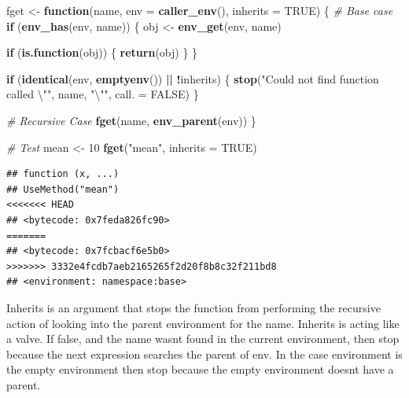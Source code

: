 \documentclass[]{book}
\newenvironment{Shaded}{\begin{snugshade}}{\end{snugshade}}
\newcommand{\CharTok}[1]{\textcolor[rgb]{0.31,0.60,0.02}{#1}}
\newcommand{\CommentTok}[1]{\textcolor[rgb]{0.56,0.35,0.01}{\textit{#1}}}
\newcommand{\ControlFlowTok}[1]{\textcolor[rgb]{0.13,0.29,0.53}{\textbf{#1}}}
\newcommand{\DataTypeTok}[1]{\textcolor[rgb]{0.13,0.29,0.53}{#1}}
\newcommand{\DecValTok}[1]{\textcolor[rgb]{0.00,0.00,0.81}{#1}}
\newcommand{\KeywordTok}[1]{\textcolor[rgb]{0.13,0.29,0.53}{\textbf{#1}}}
\newcommand{\NormalTok}[1]{#1}
\newcommand{\OperatorTok}[1]{\textcolor[rgb]{0.81,0.36,0.00}{\textbf{#1}}}
\newcommand{\OtherTok}[1]{\textcolor[rgb]{0.56,0.35,0.01}{#1}}
\newcommand{\StringTok}[1]{\textcolor[rgb]{0.31,0.60,0.02}{#1}}
\begin{document}
\begin{Shaded}
\begin{Highlighting}[]
\NormalTok{fget <-}\StringTok{ }\ControlFlowTok{function}\NormalTok{(name, }\DataTypeTok{env =} \KeywordTok{caller_env}\NormalTok{(), }\DataTypeTok{inherits =} \OtherTok{TRUE}\NormalTok{) \{}
  \CommentTok{# Base case}
  \ControlFlowTok{if}\NormalTok{ (}\KeywordTok{env_has}\NormalTok{(env, name)) \{}
\NormalTok{    obj <-}\StringTok{ }\KeywordTok{env_get}\NormalTok{(env, name)}

    \ControlFlowTok{if}\NormalTok{ (}\KeywordTok{is.function}\NormalTok{(obj)) \{}
      \KeywordTok{return}\NormalTok{(obj)}
\NormalTok{    \}}
\NormalTok{  \}}

  \ControlFlowTok{if}\NormalTok{ (}\KeywordTok{identical}\NormalTok{(env, }\KeywordTok{emptyenv}\NormalTok{()) }\OperatorTok{||}\StringTok{ }\OperatorTok{!}\NormalTok{inherits) \{}
    \KeywordTok{stop}\NormalTok{(}\StringTok{"Could not find function called }\CharTok{\textbackslash{}"}\StringTok{"}\NormalTok{, name, }\StringTok{"}\CharTok{\textbackslash{}"}\StringTok{"}\NormalTok{, }\DataTypeTok{call. =} \OtherTok{FALSE}\NormalTok{)}
\NormalTok{  \}}

  \CommentTok{# Recursive Case}
  \KeywordTok{fget}\NormalTok{(name, }\KeywordTok{env_parent}\NormalTok{(env))}
\NormalTok{\}}
\end{Highlighting}
\end{Shaded}

\begin{Shaded}
\begin{Highlighting}[]
\CommentTok{# Test}
\NormalTok{mean <-}\StringTok{ }\DecValTok{10}
\KeywordTok{fget}\NormalTok{(}\StringTok{"mean"}\NormalTok{, }\DataTypeTok{inherits =} \OtherTok{TRUE}\NormalTok{)}
\end{Highlighting}
\end{Shaded}

\begin{verbatim}
## function (x, ...) 
## UseMethod("mean")
<<<<<<< HEAD
## <bytecode: 0x7feda826fc90>
=======
## <bytecode: 0x7fcbacf6e5b0>
>>>>>>> 3332e4fcdb7aeb2165265f2d20f8b8c32f211bd8
## <environment: namespace:base>
\end{verbatim}

Inherits is an argument that stops the function from performing the recursive action of looking into the parent environment for the name. Inherits is acting like a valve. If false, and the name wasnt found in the current environment, then stop because the next expression searches the parent of env. In the case environment is the empty environment then stop because the empty environment doesnt have a parent.
\end{document}
